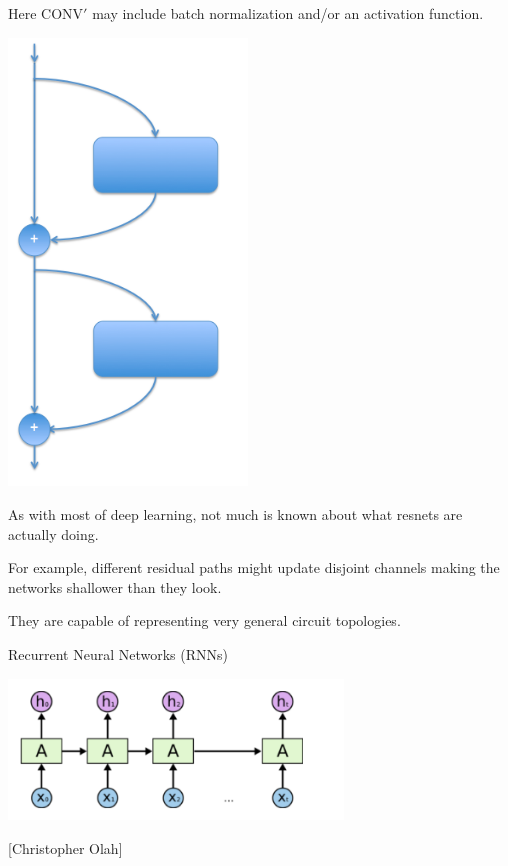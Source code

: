 {\vfill
Here $\mathrm{CONV}'$ may include batch normalization and/or an activation function.


\vfill
\includegraphics[width= 2.5in]{../images/resnet}
\hfill \begin{minipage}[b]{4in} As with most of deep learning, not much is known about what resnets are actually doing.
  
  \bigskip
  \bigskip
  For example, different residual paths might update disjoint channels making the networks shallower than they look.

  \bigskip
  \bigskip
  They are capable of representing very general circuit topologies.
\end{minipage}

\slideplain{}
\vfill
\centerline{Recurrent Neural Networks (RNNs)}
\vfill
\vfill




\centerline{\includegraphics[width=3.5in]{../images/RNN}}
\centerline{{\large [Christopher Olah]}}

}
